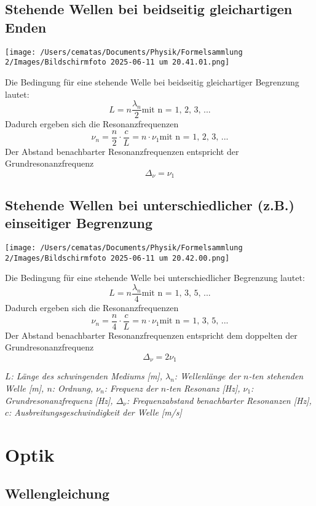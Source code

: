 \documentclass[a4paper,10pt]{article}
\newenvironment{displayformula}
{
	\begin{framed}
		\color{formulaColor}
	}
	{\end{framed}}
\newcommand{\formulalegend}[1]{%
	\par\vspace{0.5ex}%
	{{\color{legendColor}\RaggedRight\small\textit{#1}}}%
	\par\vspace{1.5ex}%
}
\begin{document}
\subsection{Stehende Wellen bei beidseitig gleichartigen Enden}

\texttt{[image: /Users/cematas/Documents/Physik/Formelsammlung 2/Images/Bildschirmfoto 2025-06-11 um 20.41.01.png]}

\begin{displayformula}
	Die Bedingung für eine stehende Welle bei beidseitig gleichartiger Begrenzung lautet:
	\[
	L = n\frac{\lambda_n}{2} \text{mit n = 1, 2, 3, ...}
	\]
	Dadurch ergeben sich die Resonanzfrequenzen
	\[
	\nu_n = \frac{n}{2} \cdot \frac{c}{L} = n \cdot \nu_1 \text{mit n = 1, 2, 3, ...}
	\]
	Der Abstand benachbarter Resonanzfrequenzen entspricht der Grundresonanzfrequenz
	\[
	\Delta_\nu = \nu_1
	\]
\end{displayformula}


\subsection{Stehende Wellen bei unterschiedlicher (z.B.) einseitiger Begrenzung}

\texttt{[image: /Users/cematas/Documents/Physik/Formelsammlung 2/Images/Bildschirmfoto 2025-06-11 um 20.42.00.png]}

\begin{displayformula}
	Die Bedingung für eine stehende Welle bei unterschiedlicher Begrenzung lautet:
	\[
	L = n\frac{\lambda_n}{4} \text{mit n = 1, 3, 5, ...}
	\]
	Dadurch ergeben sich die Resonanzfrequenzen
	\[
	\nu_n = \frac{n}{4} \cdot \frac{c}{L} = n \cdot \nu_1 \text{mit n = 1, 3, 5, ...}
	\]
	Der Abstand benachbarter Resonanzfrequenzen entspricht dem doppelten der Grundresonanzfrequenz
	\[
	\Delta_\nu = 2\nu_1
	\]
\end{displayformula}
\formulalegend{
	\( L \): Länge des schwingenden Mediums [m], 
	\( \lambda_n \): Wellenlänge der \(n\)-ten stehenden Welle [m], 
	\( n \): Ordnung, 
	\( \nu_n \): Frequenz der \(n\)-ten Resonanz [Hz], 
	\( \nu_1 \): Grundresonanzfrequenz [Hz], 
	\( \Delta_\nu \): Frequenzabstand benachbarter Resonanzen [Hz], 
	\( c \): Ausbreitungsgeschwindigkeit der Welle [m/s]
}


\section{Optik}

\subsection{Wellengleichung}
\end{document}

